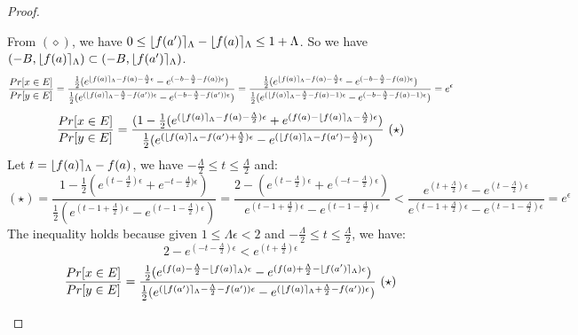 \documentclass[a4paper,11pt]{article}
\begin{document}
\begin{proof}
\begin{itemize}
	From $(\diamond)$, we have $0 \leq \lfloor f(a') \rceil_{\Lambda} - \lfloor f(a) \rceil_{\Lambda} \leq 1 + \Lambda$.
	So we have $(-B, \lfloor f(a) \rceil_{\Lambda}) \subset (-B, \lfloor f(a') \rceil_{\Lambda})$.
	\[
	\frac{Pr[x \in E]}{Pr[y \in E]} 
	= \frac{\frac{1}{2}(
				e^{\lfloor f(a) \rceil_{\Lambda} - f(a) -\frac{\Lambda}{2}\epsilon}
				- e^{(-b -\frac{\Lambda}{2} - f(a))\epsilon})}
				{\frac{1}{2}(
				e^{(\lfloor f(a) \rceil_{\Lambda} -\frac{\Lambda}{2} - f(a'))\epsilon}
				- e^{(-b -\frac{\Lambda}{2} - f(a'))\epsilon})} \\
	= \frac{\frac{1}{2}(
				e^{\lfloor f(a) \rceil_{\Lambda} - f(a) -\frac{\Lambda}{2}\epsilon}
				- e^{(-b -\frac{\Lambda}{2} - f(a))\epsilon})}
				{\frac{1}{2}(
				e^{(\lfloor f(a) \rceil_{\Lambda} -\frac{\Lambda}{2} - f(a) - 1)\epsilon}
				- e^{(-b -\frac{\Lambda}{2} - f(a) - 1)\epsilon})} \\
	= e^{\epsilon}
	\]
%
	\[
	\frac{Pr[x \in E]}{Pr[y \in E]} 
	= \frac{(1 - {\frac{1}{2}(
				e^{(\round{f(a)}_{\Lambda} - f(a) - \frac{\Lambda}{2})\epsilon}
				+ e^{(f(a) - \round{f(a)}_{\Lambda} -\frac{\Lambda}{2})\epsilon})}
			}
			{\frac{1}{2}(
				e^{(\round{f(a)}_{\Lambda} - f(a') + \frac{\Lambda}{2})\epsilon}
				- e^{(\round{f(a)}_{\Lambda} - f(a') - \frac{\Lambda}{2})\epsilon})}~(\star)
	\]
	Let $t = \lfloor f(a) \rceil_{\Lambda} - f(a)$, we have $-\frac{\Lambda}{2} \leq t \leq \frac{\Lambda}{2} $ and:
	\[
	(\star) = \frac{1 - {\frac{1}{2}(
				e^{(t - \frac{\Lambda}{2})\epsilon}
				+ e^{-t -\frac{\Lambda}{2})\epsilon})}
			}
			{\frac{1}{2}(
				e^{(t - 1 + \frac{\Lambda}{2})\epsilon}
				- e^{(t - 1 - \frac{\Lambda}{2})\epsilon})}
	= \frac{2 - (
				e^{(t - \frac{\Lambda}{2})\epsilon}
				+ e^{(-t -\frac{\Lambda}{2})\epsilon} )
			}
			{e^{(t - 1 + \frac{\Lambda}{2})\epsilon}
				- e^{(t - 1 - \frac{\Lambda}{2})\epsilon}}
	< \frac{
				e^{(t + \frac{\Lambda}{2})\epsilon} 
				-
				e^{(t - \frac{\Lambda}{2})\epsilon}
			}
			{
				e^{(t - 1 + \frac{\Lambda}{2})\epsilon}
				- e^{(t - 1 - \frac{\Lambda}{2})\epsilon}
			}	
	= e^{\epsilon}
	\]
	The inequality holds because given $1 \leq \Lambda \epsilon < 2$
	and $-\frac{\Lambda}{2} \leq t \leq \frac{\Lambda}{2} $, we have:
	\[
	2 - e^{(-t -\frac{\Lambda}{2})\epsilon} < e^{(t + \frac{\Lambda}{2})\epsilon}
	\]
	\[
	\frac{Pr[x \in E]}{Pr[y \in E]} 
	= \frac{
			\frac{1}{2}(
				e^{(f(a) - \frac{\Lambda}{2} - \round{f(a)}_{\Lambda})\epsilon}
				- e^{(f(a) + \frac{\Lambda}{2} - \round{f(a')}_{\Lambda})\epsilon})
			}
			{
			\frac{1}{2}(
				e^{(\round{f(a')}_{\Lambda} - \frac{\Lambda}{2} - f(a'))\epsilon}
				- e^{(\round{f(a)}_{\Lambda} + \frac{\Lambda}{2}  - f(a'))\epsilon})
			} ~ (\star)
	\]
	\begin{itemize}


\end{itemize}
\end{itemize}
\end{proof}
\end{document}
